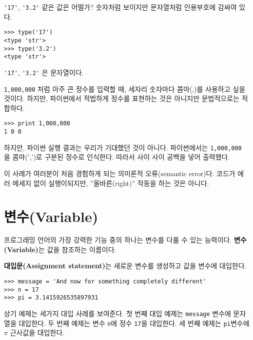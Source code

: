 \verb"'17'", \verb"'3.2'" 같은 값은 어떨가? 숫자처럼 보이지만 문자열처럼 인용부호에 감싸여 있다.


\beforeverb
\begin{verbatim}
>>> type('17')
<type 'str'>
>>> type('3.2')
<type 'str'>
\end{verbatim}
\afterverb
%

\verb"'17'", \verb"'3.2'" 은 문자열이다.

{\tt 1,000,000} 처럼 아주 큰 정수를 입력할 때, 세자리 숫자마다 콤마(,)를 사용하고 싶을 것이다. 하지만, 파이썬에서 적법하게 정수를 표현하는 것은 아니지만 문법적으로는 적합하다.

\beforeverb
\begin{verbatim}
>>> print 1,000,000
1 0 0
\end{verbatim}
\afterverb
%

하지만, 파이썬 실행 결과는 우리가 기대했던 것이 아니다. 파이썬에서는 {\tt 1,000,000} 을 콤마(',')로 구분된 정수로 인식한다. 따라서 사이 사이 공백을 넣어 출력했다.


이 사례가 여러분이 처음 경험하게 되는 의미론적 오류(semantic error)다. 
코드가 에러 메세지 없이 실행이되지만, ''올바른(right)'' 작동을 하는 것은 아니다.

\section{변수(Variable)}

프로그래밍 언어의 가장 강력한 기능 중의 하나는 변수를 다룰 수 있는 능력이다. {\bf 변수(Variable)}는 값을 참조하는 이름이다.

{\bf 대입문(Assignment statement)}는 새로운 변수를 생성하고 값을 변수에 대입한다.

\beforeverb
\begin{verbatim}
>>> message = 'And now for something completely different'
>>> n = 17
>>> pi = 3.1415926535897931
\end{verbatim}
\afterverb
%

상기 예제는 세가지 대입 사례를 보여준다. 첫 번째 대입 예제는 {\tt message} 변수에 문자열을 대입한다. 두 번째 예제는 변수 {\tt n}에 정수 {\tt 17}을 대입한다. 세 번째 예제는 {\tt pi}변수에 $\pi$ 근사값을 대입한다.

